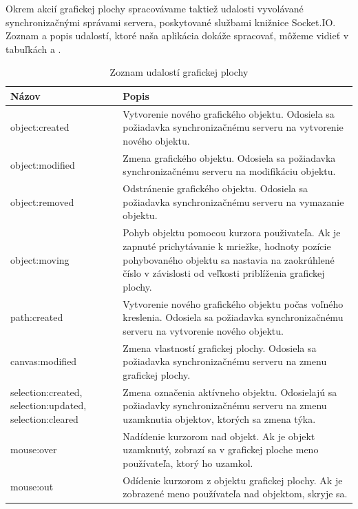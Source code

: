 Okrem akcií grafickej plochy spracovávame taktiež udalosti vyvolávané synchronizačnými správami servera, poskytované službami knižnice Socket.IO. Zoznam a popis udalostí, ktoré naša aplikácia dokáže spracovať, môžeme vidieť v tabuľkách  a .

\begin{table}
	\begin{tabular}{ | m{4cm} | m{8.5cm} | } \hline
		\textbf{Názov} & \textbf{Popis} \\ \hline \hline
		
		object:created & Vytvorenie nového grafického objektu. Odosiela sa požiadavka synchronizačnému serveru na vytvorenie nového objektu. \\\hline
		object:modified & Zmena grafického objektu. Odosiela sa požiadavka synchronizačnému serveru na modifikáciu objektu. \\\hline
		object:removed & Odstránenie grafického objektu. Odosiela sa požiadavka synchronizačnému serveru na vymazanie objektu.  \\\hline
		object:moving & Pohyb objektu pomocou kurzora použivateľa. Ak je zapnuté prichytávanie k mriežke, hodnoty pozície pohybovaného objektu sa nastavia na zaokrúhlené číslo v závislosti od veľkosti priblíženia grafickej plochy.  \\\hline
		path:created & Vytvorenie nového grafického objektu počas voľného kreslenia. Odosiela sa požiadavka synchronizačnému serveru na vytvorenie nového objektu. \\\hline
		canvas:modified & Zmena vlastností grafickej plochy. Odosiela sa požiadavka synchronizačnému serveru na zmenu grafickej plochy. \\\hline
		selection:created, selection:updated, selection:cleared & Zmena označenia aktívneho objektu. Odosielajú sa požiadavky synchronizačnému serveru na zmenu uzamknutia objektov, ktorých sa zmena týka. \\\hline
		mouse:over & Nadídenie kurzorom nad objekt. Ak je objekt uzamknutý, zobrazí sa v grafickej ploche meno používateľa, ktorý ho uzamkol. \\\hline
		mouse:out & Odídenie kurzorom z objektu grafickej plochy. Ak je zobrazené meno používateľa nad objektom, skryje sa. \\\hline
		
		\hline
	\end{tabular}
	\caption{Zoznam udalostí grafickej plochy}
	\label{tab:editor-events}
\end{table}

